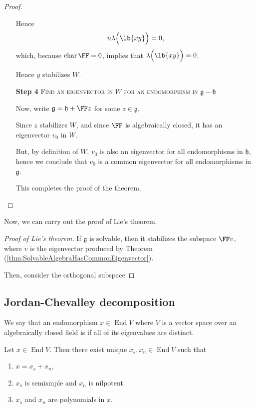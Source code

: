 \documentclass{article}
\DeclarePairedDelimiter\lb\lbrack\rbrack
\DeclareMathOperator{\End}{End}
\DeclareMathOperator{\opchar}{char}
\newcommand*\frkg{{\ensuremath{\mathfrak{g}}}}
\newcommand*\frkh{{\ensuremath{\mathfrak{h}}}}
\begin{document}
\begin{proof}
\begin{itemize}
            Hence
            \[
                n\lambda\Big(\lb{xy}\Big)
                =
                0,
            \]
            which, because $\opchar \FF = 0$, implies that $\lambda\Big(\lb{xy}\Big) = 0$.

            Hence $y$ stabilizes $W$.
    \item[\textbf{Step 4}]
        \textsc{\color{Crimson} Find an eigenvector in $W$ for an endomorphism in $\frkg - \frkh$}

        Now, write $\frkg = \frkh + \FF z$ for some $z \in \frkg$.

        Since $z$ stabilizes $W$, and since $\FF$ is algebraically closed, it has an eigenvector $v_0$ in $W$.

        But, by definition of $W$, $v_0$ is also an eigenvector for all endomorphisms in $\frkh$, hence we conclude that $v_0$ is a common eigenvector for all endomorphisms in $\frkg$.

        This completes the proof of the theorem.
    \end{itemize}
\end{proof}

Now, we can carry out the proof of Lie's theorem.

\begin{proof}[Proof of Lie's theorem]
    If $\frkg$ is solvable, then it stabilizes the subspace $\FF v$, where $v$ is the eigenvector produced by Theorem (\ref{thm:SolvableAlgebraHasCommonEigenvector}).

    Then, consider the orthogonal subspace
\end{proof}

\subsection{Jordan-Chevalley decomposition}

We say that an endomorphism $x \in \End V$ where $V$ is a vector space over an algebraically closed field is  if all of its eigenvalues are distinct.

\begin{theorem}
    \label{thm:JordanChevalley}
    Let $x \in \End V$.
    Then there exist unique $x_s, x_n \in \End V$ such that
    \begin{enumerate}[label=(\alph*)]
        \item 
            $x = x_s + x_n$,
        \item 
            $x_s$ is semismple and $x_n$ is nilpotent.
        \item 
            $x_s$ and $x_n$ are polynomials in $x$.
    \end{enumerate}
\end{theorem}
\end{document}
